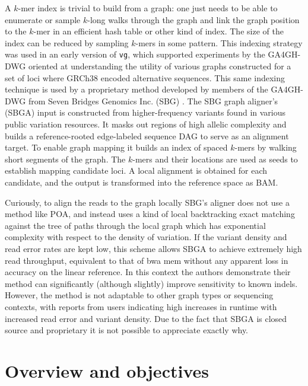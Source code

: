\documentclass[a4paper,12pt,numbered,oneside]{Classes/PhDThesisPSnPDF}
\begin{document}
A $k$-mer index is trivial to build from a graph: one just needs to be able to enumerate or sample $k$-long walks through the graph and link the graph position to the $k$-mer in an efficient hash table or other kind of index.
The size of the index can be reduced by sampling $k$-mers in some pattern.
This indexing strategy was used in an early version of {\tt vg}, which supported experiments by the GA4GH-DWG \cite{novak2017genome} oriented at understanding the utility of various graphs constructed for a set of loci where GRCh38 encoded alternative sequences.
This same indexing technique is used by a proprietary method developed by members of the GA4GH-DWG from Seven Bridges Genomics Inc. (SBG) \cite{rakocevic2018fast}.
The SBG graph aligner's (SBGA) input is constructed from higher-frequency variants found in various public variation resources.
It masks out regions of high allelic complexity and builds a reference-rooted edge-labeled sequence DAG to serve as an alignment target.
To enable graph mapping it builds an index of spaced $k$-mers by walking short segments of the graph.
The $k$-mers and their locations are used as seeds to establish mapping candidate loci.
A local alignment is obtained for each candidate, and the output is transformed into the reference space as BAM.

Curiously, to align the reads to the graph locally SBG's aligner does not use a method like POA, and instead uses a kind of local backtracking exact matching against the tree of paths through the local graph which has exponential complexity with respect to the density of variation.
If the variant density and read error rates are kept low, this scheme allows SBGA to achieve extremely high read throughput, equivalent to that of bwa mem without any apparent loss in accuracy on the linear reference.
In this context the authors demonstrate their method can significantly (although slightly) improve sensitivity to known indels.
However, the method is not adaptable to other graph types or sequencing contexts, with reports from users indicating high increases in runtime with increased read error and variant density.
Due to the fact that SBGA is closed source and proprietary it is not possible to appreciate exactly why.

\section{Overview and objectives}
\end{document}

